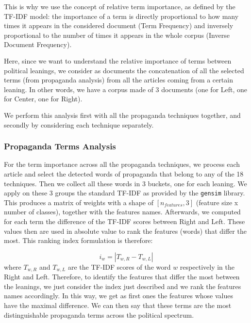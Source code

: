 This is why we use the concept of relative term importance, %
as defined by the TF-IDF model: the importance of a term is directly proportional to how many times it appears in the considered document (Term Frequency) and inversely proportional to the number of times it appears in the whole corpus (Inverse Document Frequency).

Here, since we want to understand the relative importance of terms between political leanings, we consider as documents the concatenation of all the selected terms (from propaganda analysis) from all the articles coming from a certain leaning. In other words, we have a corpus made of 3 documents (one for Left, one for Center, one for Right).

We perform this analysis first with all the propaganda techniques together, and secondly by considering each technique separately.

\subsubsection{Propaganda Terms Analysis}
For the term importance across all the propaganda techniques, we process each article and select the detected words of propaganda that belong to any of the 18 techniques. Then we collect all these words in 3 buckets, one for each leaning.
We apply on these 3 groups the standard TF-IDF as provided by the \texttt{gensim} library. %
This produces a matrix of weights with a shape of $[n_{features}, 3]$ (feature size x number of classes), together with the features names.
Afterwards, we
computed for each term the difference of the TF-IDF scores between Right and Left.
These values then are used in absolute value to rank the features (words) that differ the most.
This ranking index formulation is therefore:

$$ i_w = | T_{w,R} - T_{w,L} | $$
where $T_{w,R}$ and $T_{w,L}$ are the TF-IDF scores of the word $w$ respectively in the Right and Left.
Therefore, to identify the features that differ the most between the leanings, we just consider the index just described and we rank the features names accordingly.
In this way, we get as first ones the features whose values have the maximal difference.
We can then say that these terms are the most distinguishable propaganda terms across the political spectrum.

